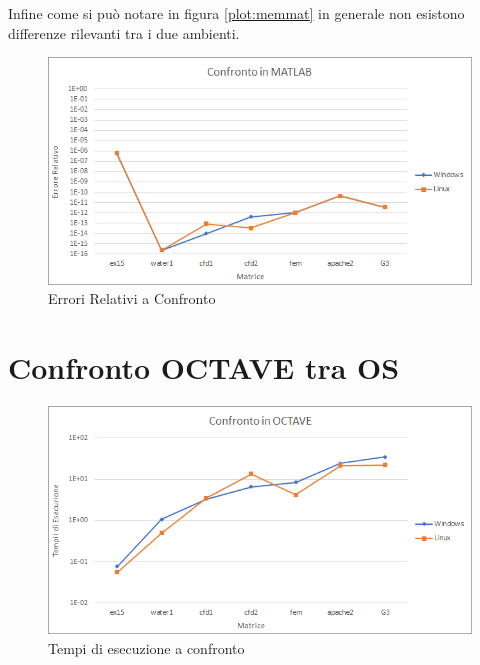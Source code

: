 \documentclass[a4paper,12pt,titlepage,oneside]{book}
\begin{document}
    \newpage
    \noindent Infine come si può notare in figura \ref{plot:memmat} in generale non esistono differenze rilevanti tra i due ambienti.\\[0.5cm]
    \begin{figure}[ht]
        \centering
        \includegraphics[scale=0.8]{src/plot/ErrMAT.png}
        \caption{Errori Relativi a Confronto}
        \label{plot:errmat}
    \end{figure}
    
    \newpage
    \section{Confronto OCTAVE tra OS}
    \begin{figure}[h]
        \centering
        \includegraphics[scale=0.8]{src/plot/TimeOCT.png}
        \caption{Tempi di esecuzione a confronto}
        \label{plot:timeoct}
    \end{figure}
    
\end{document}
